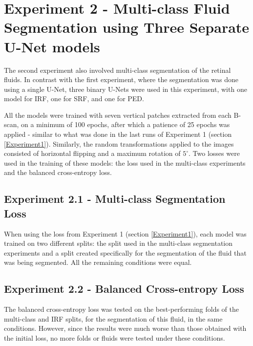 \section{Experiment 2 - Multi-class Fluid Segmentation using Three Separate U-Net models}\label{Experiment2}

The second experiment also involved multi-class segmentation of the retinal fluids. In contrast with the first experiment, where the segmentation was done using a single U-Net, three binary U-Nets were used in this experiment, with one model for IRF, one for SRF, and one for PED.
\par
All the models were trained with seven vertical patches extracted from each B-scan, on a minimum of 100 epochs, after which a patience of 25 epochs was applied - similar to what was done in the last runs of Experiment 1 (section \ref{Experiment1}). Similarly, the random transformations applied to the images consisted of horizontal flipping and a maximum rotation of $5^{\circ}$. Two losses were used in the training of these models: the loss used in the multi-class experiments and the balanced cross-entropy loss.

\subsection{Experiment 2.1 - Multi-class Segmentation Loss}

When using the loss from Experiment 1 (section \ref{Experiment1}), each model was trained on two different splits: the split used in the multi-class segmentation experiments and a split created specifically for the segmentation of the fluid that was being segmented. All the remaining conditions were equal.

\subsection{Experiment 2.2 - Balanced Cross-entropy Loss}

The balanced cross-entropy loss was tested on the best-performing folds of the multi-class and IRF splits, for the segmentation of this fluid, in the same conditions. However, since the results were much worse than those obtained with the initial loss, no more folds or fluids were tested under these conditions.

